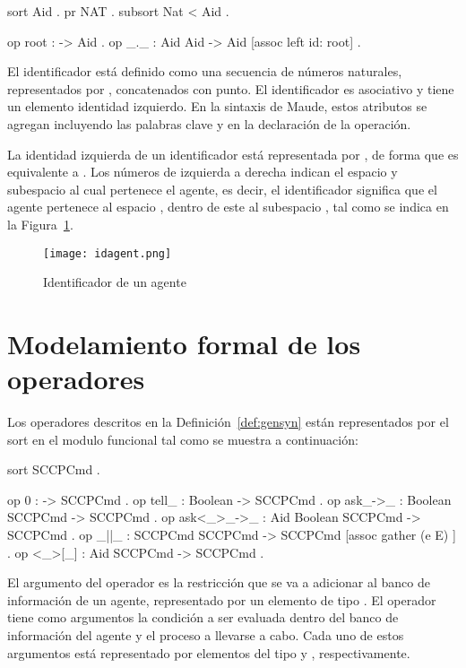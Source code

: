 \begin{maude}
  sort Aid .
  pr NAT .
  subsort Nat < Aid .

  op root : -> Aid .
  op _._ : Aid Aid -> Aid [assoc left id: root] .
\end{maude}

El identificador est\'a definido como una secuencia de n\'umeros naturales, representados por , concatenados con punto. El identificador es asociativo y tiene un elemento identidad izquierdo. En la sintaxis de Maude, estos atributos se agregan incluyendo las palabras clave  y  en la declaraci\'on de la operaci\'on. 

La identidad izquierda de un identificador est\'a representada por , de forma que  es equivalente a . Los n\'umeros de izquierda a derecha indican el espacio y subespacio al cual pertenece el agente, es decir, el identificador  significa que el agente pertenece al espacio , dentro de este al subespacio , tal como se indica en la Figura~\ref{fig:agentid}.

\begin{figure}[htbp] %
   \centering
   \texttt{[image: idagent.png]} 
   \caption{Identificador de un agente}
   \label{fig:agentid}
\end{figure}

\section{Modelamiento formal de los operadores}
\label{syntax.rew}

Los operadores descritos en la Definici\'on~\ref{def:gensyn} est\'an representados por el sort  en el modulo funcional  tal como se muestra a continuaci\'on:

\begin{maude}
  sort SCCPCmd .

  op 0 : -> SCCPCmd . 
  op tell_ : Boolean -> SCCPCmd . 
  op ask_->_ : Boolean SCCPCmd -> SCCPCmd .
  op ask<_>_->_ : Aid Boolean SCCPCmd -> SCCPCmd .
  op _||_ : SCCPCmd SCCPCmd -> SCCPCmd [assoc gather (e E) ] .
  op <_>[_] : Aid SCCPCmd -> SCCPCmd .
\end{maude}

El argumento del operador  es la restricci\'on que se va a adicionar al banco de informaci\'on de un agente, representado por un elemento de tipo . El operador  tiene como argumentos la condici\'on a ser evaluada dentro del banco de informaci\'on del agente y el proceso a llevarse a cabo. Cada uno de estos argumentos est\'a representado por elementos del tipo  y , respectivamente.

